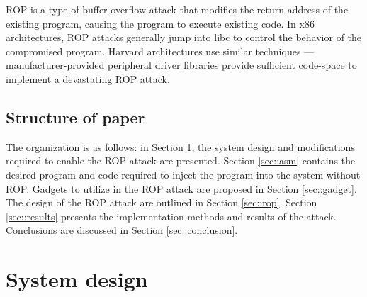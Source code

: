 	ROP is a type of buffer-overflow attack that modifies the return address of the existing program, causing the program to execute existing code. In x86 architectures, ROP attacks generally jump into libc to control the behavior of the compromised program. Harvard architectures use similar techniques --- manufacturer-provided peripheral driver libraries provide sufficient code-space to implement a devastating ROP attack.  



\subsection{Structure of paper}
	The organization is as follows: in Section \ref{sec::design}, the system design and modifications required to enable the ROP attack are presented. Section \ref{sec::asm} contains the desired program and code required to inject the program into the system without ROP. Gadgets to utilize in the ROP attack are proposed in Section \ref{sec::gadget}. The design of the ROP attack are outlined in Section \ref{sec::rop}. Section \ref{sec::results} presents the implementation methods and results of the attack. Conclusions are discussed in Section \ref{sec::conclusion}. 




\section{System design} \label{sec::design} %


